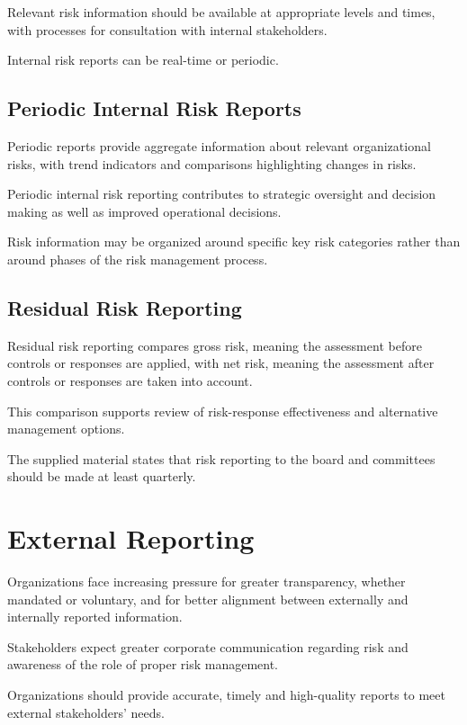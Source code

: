 \documentclass[
]{book}
\begin{document}
Relevant risk information should be available at appropriate levels and times, with processes for consultation with internal stakeholders.

Internal risk reports can be real-time or periodic.

\subsection{Periodic Internal Risk Reports}\label{periodic-internal-risk-reports}

Periodic reports provide aggregate information about relevant organizational risks, with trend indicators and comparisons highlighting changes in risks.

Periodic internal risk reporting contributes to strategic oversight and decision making as well as improved operational decisions.

Risk information may be organized around specific key risk categories rather than around phases of the risk management process.

\subsection{Residual Risk Reporting}\label{residual-risk-reporting}

Residual risk reporting compares gross risk, meaning the assessment before controls or responses are applied, with net risk, meaning the assessment after controls or responses are taken into account.

This comparison supports review of risk-response effectiveness and alternative management options.

The supplied material states that risk reporting to the board and committees should be made at least quarterly.

\section{External Reporting}\label{external-reporting}

Organizations face increasing pressure for greater transparency, whether mandated or voluntary, and for better alignment between externally and internally reported information.

Stakeholders expect greater corporate communication regarding risk and awareness of the role of proper risk management.

Organizations should provide accurate, timely and high-quality reports to meet external stakeholders' needs.
\end{document}
